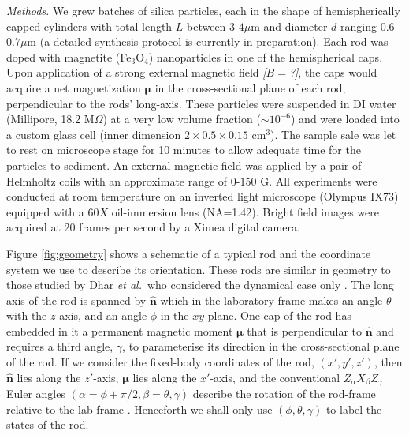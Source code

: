 \documentclass[aps,prl,twocolumn,superscriptaddress]{revtex4-1}
\newcommand{\hvcrm}[1]{\mathbf{\hat{#1}}}
\newcommand{\vc}[1]{\boldsymbol{#1}}
\begin{document}
\emph{Methods.} We grew batches of silica particles, each in the shape of hemispherically capped cylinders with total length $L$ between $3$-$4  \mu$m and diameter $d$ ranging $0.6$-$0.7 \mu$m (a detailed synthesis protocol is currently in preparation). Each rod was doped with magnetite (Fe$_3$O$_4$) nanoparticles in one of the hemispherical caps. Upon application of a strong external magnetic field \emph{[$B=$?]}, the caps would acquire a net magnetization $\vc{\mu}$ in the cross-sectional plane of each rod, perpendicular to the rods' long-axis. These particles were suspended in DI water (Millipore, 18.2 M$\Omega$) at a very low volume fraction ($\sim 10^{-6}$) and were loaded into a custom glass cell (inner dimension $2\times0.5\times0.15$ cm$^3$). The sample sale was let to rest on microscope stage for 10 minutes to allow adequate time for the particles to sediment. An external magnetic field was applied by a pair of Helmholtz coils with an approximate range of $0$-$150$ G. All experiments were conducted at room temperature on an inverted light microscope (Olympus IX73) equipped with a $60X$ oil-immersion lens (NA=1.42). Bright field images were acquired at 20 frames per second by a Ximea digital camera.

Figure \ref{fig:geometry} shows a schematic of a typical rod and the coordinate system we use to describe its orientation. These rods are similar in geometry to those studied by Dhar \emph{et al.}\ who considered the dynamical case only \cite{Dhar2007}. The long axis of the rod is spanned by $\hvcrm{n}$ which in the laboratory frame makes an angle $\theta$ with the $z$-axis, and an angle $\phi$ in the $xy$-plane. One cap of the rod has embedded in it a permanent magnetic moment $\vc{\mu}$ that is perpendicular to $\hvcrm{n}$ and requires a third angle, $\gamma$, to parameterise its direction in the cross-sectional plane of the rod. If we consider the fixed-body coordinates of the rod, $(x',y',z')$, then $\hvcrm{n}$ lies along the $z'$-axis, $\vc{\mu}$ lies along the $x'$-axis, and the conventional $Z_\alpha X_\beta Z_\gamma$ Euler angles $(\alpha=\phi+\pi/2, \beta=\theta, \gamma)$ describe the rotation of the rod-frame relative to the lab-frame \cite{Landau1969}. Henceforth we shall only use $(\phi,\theta,\gamma)$ to label the states of the rod. 
\end{document}
